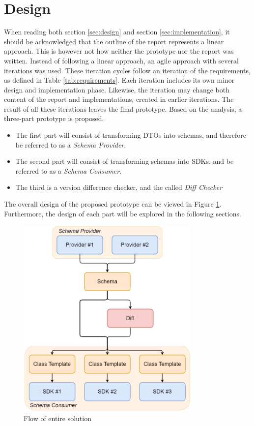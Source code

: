 \section{Design \label{sec:design}}
When reading both section \ref{sec:design} and section \ref{sec:implementation}, it should be acknowledged that the outline of the report represents a linear approach. This is however not how neither the prototype nor the report was written. Instead of following a linear approach, an agile approach with several iterations was used. These iteration cycles follow an iteration of the requirements, as defined in Table \ref{tab:requirements}. Each iteration includes its own minor design and implementation phase. Likewise, the iteration may change both content of the report and implementations, created in earlier iterations. The result of all these iterations leaves the final prototype.
\newline\newline
Based on the analysis, a three-part prototype is proposed. 
\begin{itemize}
    \item The first part will consist of transforming DTOs into schemas, and therefore be referred to as a \textit{Schema Provider}.
    \item The second part will consist of transforming schemas into SDKs, and be referred to as a \textit{Schema Consumer}.
    \item The third is a version difference checker, and the called \textit{Diff Checker}
\end{itemize}
The overall design of the proposed prototype can be viewed in Figure \ref{fig:mapping_flow}. 
Furthermore, the design of each part will be explored in the following sections.
\begin{figure}[h]
    \centering \includegraphics[height=10cm]{figures/assets/mapping_flow.png}
    \caption{Flow of entire solution}
    \label{fig:mapping_flow}
\end{figure}


